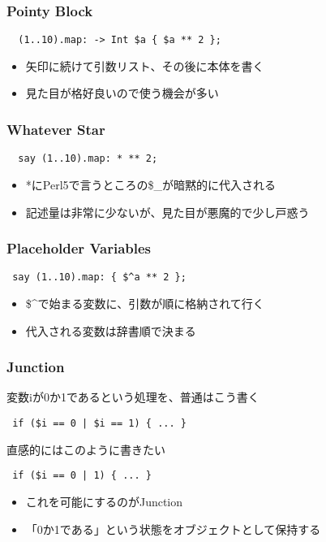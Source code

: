 \documentclass[14pt,dvipdfm,trans]{beamer}
\begin{document}
\begin{frame}[fragile]
 \frametitle{Pointy Block}
 \begin{lstlisting}
  (1..10).map: -> Int $a { $a ** 2 };
 \end{lstlisting}
 \begin{itemize}
  \item 矢印に続けて引数リスト、その後に本体を書く
  \item 見た目が格好良いので使う機会が多い
 \end{itemize}
\end{frame}
 
\begin{frame}[fragile]
 \frametitle{Whatever Star}
 \begin{lstlisting}
  say (1..10).map: * ** 2;
 \end{lstlisting}

 \begin{itemize}
  \item *にPerl5で言うところの\$\_が暗黙的に代入される
  \item 記述量は非常に少ないが、見た目が悪魔的で少し戸惑う
 \end{itemize}
\end{frame}

\begin{frame}[fragile]
 \frametitle{Placeholder Variables}
 \begin{lstlisting}
 say (1..10).map: { $^a ** 2 };
 \end{lstlisting}

 \begin{itemize}
  \item \$\^{}で始まる変数に、引数が順に格納されて行く
  \item 代入される変数は辞書順で決まる
 \end{itemize}
\end{frame}

\begin{frame}[fragile]
 \frametitle{Junction}
変数iが0か1であるという処理を、普通はこう書く
\begin{lstlisting}
 if ($i == 0 | $i == 1) { ... }
\end{lstlisting}

直感的にはこのように書きたい
\begin{lstlisting}
 if ($i == 0 | 1) { ... }
\end{lstlisting}

\begin{itemize}
 \item これを可能にするのがJunction
 \item 「0か1である」という状態をオブジェクトとして保持する
\end{itemize}
\end{frame}
\end{document}
